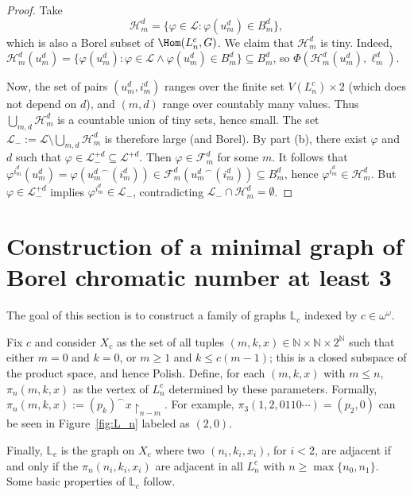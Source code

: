 \documentclass[12pt]{article}
\begin{document}
\begin{proof}
    Take $$\mathcal H^d_m=\{\varphi\in\mathcal L:\varphi(u^d_m)\in B^d_m\},$$ which is also a Borel subset of $\Hom(L^c_n,G)$.
    We claim that $\mathcal H^d_m$ is tiny.
    Indeed, $\mathcal H^d_m(u^d_m)=\{\varphi(u^d_m):\varphi\in\mathcal L\land\varphi(u^d_m)\in B^d_m\}\subseteq B^d_m$, so $\Phi(\mathcal H^d_m(u^d_m),\ell^d_m)$.
    
    Now, the set of pairs $(u^d_m,i^d_m)$ ranges over the finite set $V(L^c_n)\times2$ (which does not depend on $d$), and $(m,d)$ range over countably many values.
    Thus $\bigcup_{m,d}\mathcal H^d_m$ is a countable union of tiny sets, hence small.
    The set $\mathcal L_-:=\mathcal L\setminus\bigcup_{m,d}\mathcal H^d_m$ is therefore large (and Borel).
    By part (b), there exist $\varphi$ and $d$ such that $\varphi\in\mathcal L_-^{+d}\subseteq\mathcal L^{+d}$.
    Then $\varphi\in\mathcal F^d_m$ for some $m$.
    It follows that $\varphi^{i^d_m}(u^d_m)=\varphi({u^d_m}^\smallfrown(i^d_m))\in\mathcal F^d_m({u^d_m}^\smallfrown(i^d_m))\subseteq B^d_m$, hence $\varphi^{i^d_m}\in\mathcal H^d_m$.
    But $\varphi\in\mathcal L_-^{+d}$ implies $\varphi^{i^d_m}\in\mathcal L_-$, contradicting $\mathcal L_-\cap\mathcal H^d_m=\emptyset$.
\end{proof}

\section{Construction of a minimal graph of Borel chromatic number at least 3}\label{sec:L0-construction}

The goal of this section is to construct a family of graphs $\mathbb L_c$ indexed by $c\in\omega^\omega$.

Fix $c$ and consider $X_c$ as the set of all tuples $(m,k,x)\in\mathbb N\times\mathbb N\times2^\mathbb N$ such that either $m=0$ and $k=0$, or $m\geq1$ and $k\leq c(m-1)$; this is a closed subspace of the product space, and hence Polish.
Define, for each $(m,k,x)$ with $m\leq n$, $\pi_n(m,k,x)$ as the vertex of $L^c_n$ determined by these parameters.
Formally, $\pi_n(m,k,x):=(p_k)^\smallfrown x\restriction_{n-m}$.
For example, $\pi_3(1,2,0110\cdots)=(p_2,0)$ can be seen in Figure~\ref{fig:L_n} labeled as $(2,0)$.

Finally, $\mathbb L_c$ is the graph on $X_c$ where two $(n_i,k_i,x_i)$, for $i<2$, are adjacent if and only if the $\pi_n(n_i,k_i,x_i)$ are adjacent in all $L^c_n$ with $n\geq\max\{n_0,n_1\}$.
Some basic properties of $\mathbb L_c$ follow.
\end{document}
